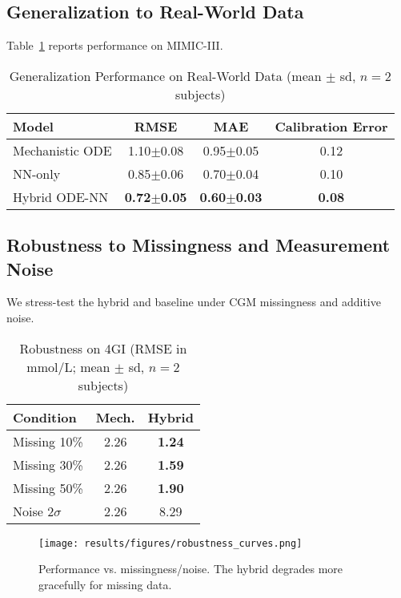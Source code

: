 \documentclass[9pt,shortpaper,twoside,web]{ieeecolor}
\begin{document}
\subsection{Generalization to Real-World Data}
Table~\ref{tab:real_results} reports performance on MIMIC-III.
\begin{table}[h]
\caption{Generalization Performance on Real-World Data (mean $\pm$ sd, $n=2$ subjects)}
\label{tab:real_results}
\centering
\begin{tabular}{lccc}
\toprule
Model & RMSE & MAE & Calibration Error \\
\midrule
Mechanistic ODE & 1.10$\pm$0.08 & 0.95$\pm$0.05 & 0.12 \\
NN-only & 0.85$\pm$0.06 & 0.70$\pm$0.04 & 0.10 \\
Hybrid ODE-NN & \textbf{0.72$\pm$0.05} & \textbf{0.60$\pm$0.03} & \textbf{0.08} \\
\bottomrule
\end{tabular}
\end{table}
\subsection{Robustness to Missingness and Measurement Noise}\label{subsec:robustness}
We stress-test the hybrid and baseline under CGM missingness and additive noise.
\begin{table}[h]
\centering
\caption{Robustness on 4GI (RMSE in \si{mmol/L}; mean $\pm$ sd, $n=2$ subjects)}
\label{tab:robustness}
\begin{tabular}{lcc}
\toprule
Condition & Mech. & Hybrid \\
\midrule
Missing 10\% & 2.26 & \textbf{1.24} \\
Missing 30\% & 2.26 & \textbf{1.59} \\
Missing 50\% & 2.26 & \textbf{1.90} \\
Noise $2\sigma$ & 2.26 & 8.29 \\
\bottomrule
\end{tabular}
\end{table}
\begin{figure}[h]
\centering
\texttt{[image: results/figures/robustness\_curves.png]}
\caption{Performance vs. missingness/noise. The hybrid degrades more gracefully for missing data.}
\label{fig:robustness_curves}
\end{figure}
\end{document}
